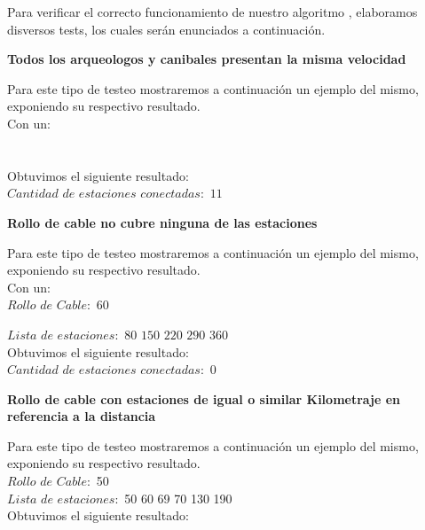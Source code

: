 \indent Para verificar el correcto funcionamiento de nuestro algoritmo , elaboramos disversos tests,
los cuales ser\'an enunciados a continuaci\'on.\\

\begin{center}
 \textbf{Todos los arqueologos y canibales presentan la misma velocidad}
\end{center}
 Para este tipo de testeo mostraremos a continuaci\'on un ejemplo del mismo, exponiendo su respectivo resultado.\\

 Con un:\\\\
  \indent  \\
	
	  
  
  Obtuvimos el siguiente resultado:\\
  
  $Cantidad$ $de$ $estaciones$ $conectadas:$ $11$

 \begin{center}
 \textbf{Rollo de cable no cubre ninguna de las estaciones}
\end{center}

Para este tipo de testeo mostraremos a continuaci\'on un ejemplo del mismo, exponiendo su respectivo resultado.\\

 Con un:\\
  \indent $Rollo$ $de$ $Cable:$ $60$

  $Lista$ $de$ $estaciones:$ $80$ $150$ $220$ $290$ $360$\\
  
  Obtuvimos el siguiente resultado:\\
  
  $Cantidad$ $de$ $estaciones$ $conectadas:$ $0$


\begin{center}
 \textbf{Rollo de cable con estaciones de igual o similar Kilometraje en referencia a la distancia}
\end{center}

Para este tipo de testeo mostraremos a continuaci\'on un ejemplo del mismo, exponiendo su respectivo resultado.\\

\indent $Rollo$ $de$ $Cable:$ 50\\
$Lista$ $de$ $estaciones:$ 50 60 69 70 130 190\\

Obtuvimos el siguiente resultado:\\
  
